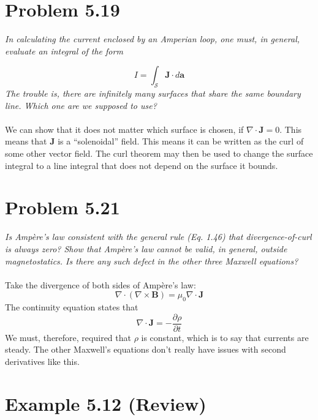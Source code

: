 \documentclass[10pt]{article}
\begin{document}
\section{Problem 5.19}

\textit{In calculating the current enclosed by an Amperian loop, one must, in general, evaluate an integral of the form}

\begin{equation}
I = \int_{\mathcal{S}} \mathbf{J} \cdot d\mathbf{a}
\end{equation}
\noindent
\textit{The trouble is, there are infinitely many surfaces that share the same boundary line.  Which one are we supposed to use?} \\ \\
We can show that it does not matter which surface is chosen, if $\nabla \cdot \mathbf{J} = 0$.  This means that $\mathbf{J}$ is a ``solenoidal'' field.  This means it can be written as the curl of some other vector field.  The curl theorem may then be used to change the surface integral to a line integral that does not depend on the surface it bounds.

\section{Problem 5.21}

\textit{Is Amp\`{e}re's law consistent with the general rule (Eq. 1.46) that divergence-of-curl is always zero?  Show that Amp\`{e}re's law cannot be valid, in general, outside magnetostatics.  Is there any such defect in the other three Maxwell equations?} \\ \\
Take the divergence of both sides of Amp\`{e}re's law:
\begin{equation}
\nabla \cdot (\nabla \times \mathbf{B}) = \mu_0 \nabla \cdot \mathbf{J}
\end{equation}
\noindent
The continuity equation states that
\begin{equation}
\nabla \cdot \mathbf{J} = -\frac{\partial \rho}{\partial t}
\end{equation}
We must, therefore, required that $\rho$ is constant, which is to say that currents are steady.  The other Maxwell's equations don't really have issues with second derivatives like this.

\section{Example 5.12 (Review)}
\end{document}
